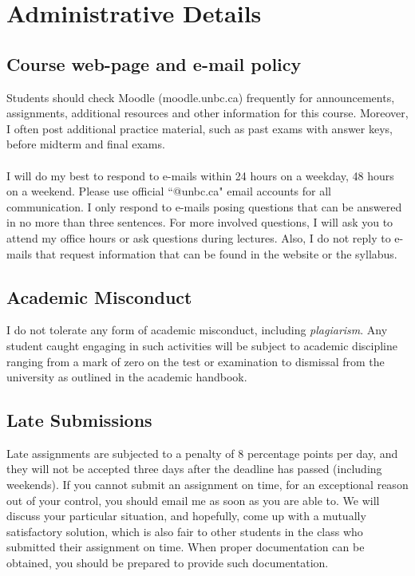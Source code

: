 \documentclass[letterpaper,12pt]{article}
\theoremstyle{dotlessS}
\begin{document}
\section{Administrative Details}
\subsection*{Course web-page and e-mail policy}
Students should check Moodle (moodle.unbc.ca) frequently for announcements, assignments, additional resources and other information for this course.  Moreover, I often post additional practice material, such as past exams with answer keys, before midterm and final exams.\\
\\   
I will do my best to respond to e-mails within 24 hours on a weekday, 48 hours on a weekend. Please use official ``@unbc.ca" email accounts for all communication. I only respond to e-mails posing questions that can be answered in no more than three sentences. For more involved questions, I will ask you to attend my office hours or ask questions during lectures. Also, I do not reply to e-mails that request information that can be found in the website or the syllabus.

\subsection*{Academic Misconduct}
I do not tolerate any form of academic misconduct, including \textit{plagiarism}. Any student caught engaging in such activities will be subject to academic discipline ranging from a mark of zero on the test or examination to dismissal from the university as outlined in the academic handbook.

\subsection*{Late Submissions}
Late assignments are subjected to a penalty of $8$ percentage points per day, and they will not be accepted three days after the deadline has passed (including weekends). If you cannot submit an assignment on time, for an exceptional reason out of your control, you should email me as soon as you are able to. We will discuss your particular situation, and hopefully, come up with a mutually satisfactory solution, which is also fair to other students in the class who submitted their assignment on time. When proper documentation can be obtained, you should be prepared to provide such documentation.    
\end{document}
